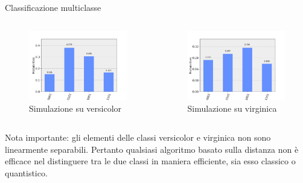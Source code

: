 \documentclass{beamer}
\begin{document}
    \begin{frame}{Classificazione multiclasse}
        \begin{columns}
            \begin{figure}[h]
                \centering
                \includegraphics[width=\linewidth]{gfx/multiclass_versicolor}
                \caption{Simulazione su versicolor}
                \label{fig:multiclass.versicolor}
            \end{figure}
            \begin{figure}[h]
                \centering
                \includegraphics[width=\linewidth]{gfx/multiclass_virginica}
                \caption{Simulazione su virginica}
                \label{fig:multiclass.virginica}
            \end{figure}
        \end{columns}
        Nota importante: gli elementi delle classi versicolor e virginica non sono linearmente separabili. 
        Pertanto qualsiasi algoritmo basato sulla distanza non è efficace nel distinguere tra le due classi 
        in maniera efficiente, sia esso classico o quantistico. 
    \end{frame}
\end{document}
